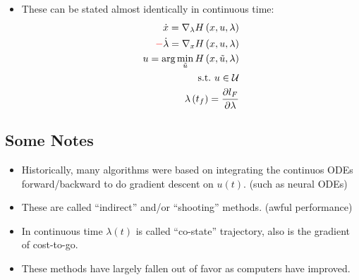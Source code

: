 \begin{itemize}
    \begin{enumerate}
        \item we get $x_0,\lambda_N$, initialize $u$ trajectory.
        \item forward rollout to get $x_1, \cdots, x_N$
        \item now we have $x,u$, backward iteration to get $\lambda$.
        \item now we have $x,u, \lambda$, solve the constraint optimization problem to get $\Delta u$, use line search method. Back to step 2.
    \end{enumerate}
    无论系统本身是线性的还是非线性的（线性的系统局部线性化就等于本身），我们一直分析的是类似$\Delta\dot x=A\Delta x+B\Delta u$这种系统，迭代法寻找的总是$\Delta u$，因为一切的一切比如$\lambda,x$都是在上一个$u$的基础上获得的，我们经过rollout后得到的值。从上面这几步可以看出，基于shooting方法迭代求解该方程，需要有一次正向传播过程，再有一次反向传播过程，这就很像训练神经网络的梯度下降更新权重的过程。这个过程实际是比较慢的，下节会举例对比说明，所以在现代，基本都不会根据这个流程做了，这种方法无论是收敛性、数值优劣和鲁棒性都不够强。
    \item These can be stated almost identically in continuous time:
    \begin{equation}
        \begin{aligned}
            \dot{x}=\nabla _{\lambda}H\left( x,u,\lambda \right)\\
            \textcolor{red}{-}\dot{\lambda}=\nabla _xH\left( x,u,\lambda \right)\\
            u=\text{arg}\min _{\tilde{u}}H\left( x,\tilde{u},\lambda \right)\\
            \text{s.t.\,\,}u\in \mathcal{U}\\
            \lambda \left( t_f \right) =\frac{\partial l_F}{\partial \lambda}\\
        \end{aligned}
    \end{equation}
\end{itemize}

\subsection{Some Notes}
\begin{itemize}
    \item Historically, many algorithms were based on integrating the continuos ODEs forward/backward to do gradient descent on $u(t)$. (such as neural ODEs)
    \item These are called ``indirect'' and/or ``shooting'' methods. (awful performance)
    \item In continuous time $\lambda(t)$ is called ``co-state'' trajectory, also is the gradient of cost-to-go.
    \item These methods have largely fallen out of favor as computers have improved.
\end{itemize}